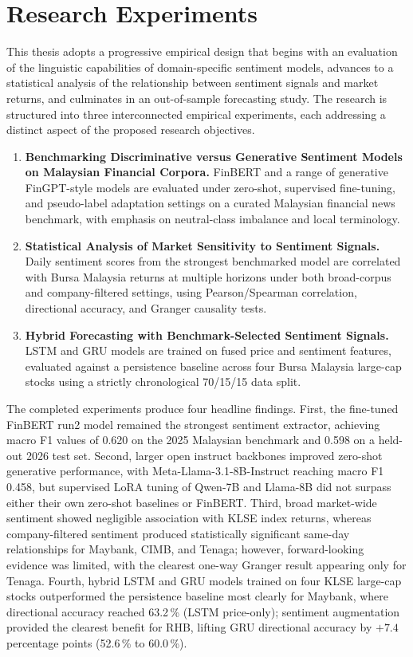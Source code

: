 \documentclass[12pt]{ucetd}
\begin{document}
\section{Research Experiments}

This thesis adopts a progressive empirical design that begins with an evaluation of the linguistic capabilities of domain-specific sentiment models, advances to a statistical analysis of the relationship between sentiment signals and market returns, and culminates in an out-of-sample forecasting study. The research is structured into three interconnected empirical experiments, each addressing a distinct aspect of the proposed research objectives.

\begin{enumerate}
    \item \textbf{Benchmarking Discriminative versus Generative Sentiment Models on Malaysian Financial Corpora.} FinBERT and a range of generative FinGPT-style models are evaluated under zero-shot, supervised fine-tuning, and pseudo-label adaptation settings on a curated Malaysian financial news benchmark, with emphasis on neutral-class imbalance and local terminology.

    \item \textbf{Statistical Analysis of Market Sensitivity to Sentiment Signals.} Daily sentiment scores from the strongest benchmarked model are correlated with Bursa Malaysia returns at multiple horizons under both broad-corpus and company-filtered settings, using Pearson/Spearman correlation, directional accuracy, and Granger causality tests.

    \item \textbf{Hybrid Forecasting with Benchmark-Selected Sentiment Signals.} LSTM and GRU models are trained on fused price and sentiment features, evaluated against a persistence baseline across four Bursa Malaysia large-cap stocks using a strictly chronological 70/15/15 data split.
\end{enumerate}

The completed experiments produce four headline findings. First, the fine-tuned FinBERT run2 model remained the strongest sentiment extractor, achieving macro F1 values of 0.620 on the 2025 Malaysian benchmark and 0.598 on a held-out 2026 test set. Second, larger open instruct backbones improved zero-shot generative performance, with Meta-Llama-3.1-8B-Instruct reaching macro F1 0.458, but supervised LoRA tuning of Qwen-7B and Llama-8B did not surpass either their own zero-shot baselines or FinBERT. Third, broad market-wide sentiment showed negligible association with KLSE index returns, whereas company-filtered sentiment produced statistically significant same-day relationships for Maybank, CIMB, and Tenaga; however, forward-looking evidence was limited, with the clearest one-way Granger result appearing only for Tenaga. Fourth, hybrid LSTM and GRU models trained on four KLSE large-cap stocks outperformed the persistence baseline most clearly for Maybank, where directional accuracy reached 63.2\,\% (LSTM price-only); sentiment augmentation provided the clearest benefit for RHB, lifting GRU directional accuracy by $+7.4$ percentage points (52.6\,\% to 60.0\,\%).
\end{document}
